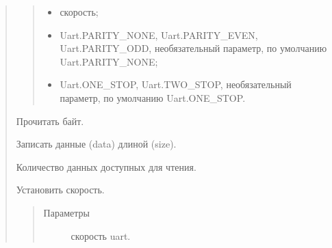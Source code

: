 \documentclass[a4paper,10pt,russian]{sphinxmanual}
\begin{document}
\begin{quote}
\begin{fulllineitems}
\begin{fulllineitems}
\begin{quote}
\begin{description}
\begin{itemize}
\item {} 
 \textendash{} скорость;

\item {} 
 \textendash{} Uart.PARITY\_NONE, Uart.PARITY\_EVEN, Uart.PARITY\_ODD, необязательный параметр, по умолчанию Uart.PARITY\_NONE;

\item {} 
 \textendash{} Uart.ONE\_STOP, Uart.TWO\_STOP, необязательный параметр, по умолчанию Uart.ONE\_STOP.

\end{itemize}

\end{description}\end{quote}

\end{fulllineitems}


\begin{fulllineitems}
\label{\detokenize{programming/lua/lua:Uart.read}}
Прочитать  байт.

\end{fulllineitems}


\begin{fulllineitems}
\label{\detokenize{programming/lua/lua:Uart.write}}
Записать данные (data) длиной (size).

\end{fulllineitems}


\begin{fulllineitems}
\label{\detokenize{programming/lua/lua:Uart.bytesToRead}}
Количество данных доступных для чтения.

\end{fulllineitems}


\begin{fulllineitems}
\label{\detokenize{programming/lua/lua:Uart.setBaudRate}}
Установить скорость.
\begin{quote}\begin{description}
\item[{Параметры}] \leavevmode
{} \textendash{} скорость uart.


\end{description}
\end{quote}
\end{fulllineitems}
\end{fulllineitems}
\end{quote}
\end{document}

